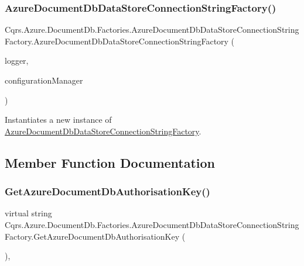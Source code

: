 \subsubsection{\texorpdfstring{Azure\+Document\+Db\+Data\+Store\+Connection\+String\+Factory()}{AzureDocumentDbDataStoreConnectionStringFactory()}}
{\footnotesize\ttfamily Cqrs.\+Azure.\+Document\+Db.\+Factories.\+Azure\+Document\+Db\+Data\+Store\+Connection\+String\+Factory.\+Azure\+Document\+Db\+Data\+Store\+Connection\+String\+Factory (\begin{DoxyParamCaption}\item[{I\+Logger}]{logger,  }\item[{\hyperlink{interfaceCqrs_1_1Configuration_1_1IConfigurationManager}{I\+Configuration\+Manager}}]{configuration\+Manager }\end{DoxyParamCaption})}



Instantiates a new instance of \hyperlink{classCqrs_1_1Azure_1_1DocumentDb_1_1Factories_1_1AzureDocumentDbDataStoreConnectionStringFactory}{Azure\+Document\+Db\+Data\+Store\+Connection\+String\+Factory}. 



\subsection{Member Function Documentation}
\mbox{\label{classCqrs_1_1Azure_1_1DocumentDb_1_1Factories_1_1AzureDocumentDbDataStoreConnectionStringFactory_a794c6926a7b29f927d41a0160716972a_a794c6926a7b29f927d41a0160716972a}} 
\subsubsection{\texorpdfstring{Get\+Azure\+Document\+Db\+Authorisation\+Key()}{GetAzureDocumentDbAuthorisationKey()}}
{\footnotesize\ttfamily virtual string Cqrs.\+Azure.\+Document\+Db.\+Factories.\+Azure\+Document\+Db\+Data\+Store\+Connection\+String\+Factory.\+Get\+Azure\+Document\+Db\+Authorisation\+Key (\begin{DoxyParamCaption}{ }\end{DoxyParamCaption})\hspace{0.3cm}{\ttfamily [protected]}, {\ttfamily [virtual]}}



